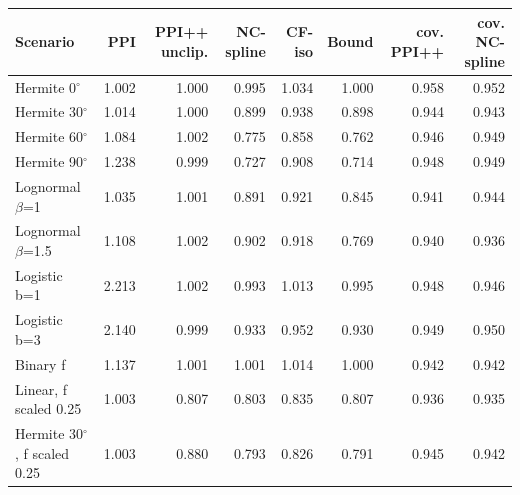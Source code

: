 \begin{tabular}{lrrrrrrr}
\toprule
Scenario & PPI & PPI++ unclip. & NC-spline & CF-iso & Bound & cov. PPI++ & cov. NC-spline \\
\midrule
Hermite 0$^\circ$ & 1.002 & 1.000 & 0.995 & 1.034 & 1.000 & 0.958 & 0.952 \\
Hermite 30$^\circ$ & 1.014 & 1.000 & 0.899 & 0.938 & 0.898 & 0.944 & 0.943 \\
Hermite 60$^\circ$ & 1.084 & 1.002 & 0.775 & 0.858 & 0.762 & 0.946 & 0.949 \\
Hermite 90$^\circ$ & 1.238 & 0.999 & 0.727 & 0.908 & 0.714 & 0.948 & 0.949 \\
Lognormal $\beta$=1 & 1.035 & 1.001 & 0.891 & 0.921 & 0.845 & 0.941 & 0.944 \\
Lognormal $\beta$=1.5 & 1.108 & 1.002 & 0.902 & 0.918 & 0.769 & 0.940 & 0.936 \\
Logistic b=1 & 2.213 & 1.002 & 0.993 & 1.013 & 0.995 & 0.948 & 0.946 \\
Logistic b=3 & 2.140 & 0.999 & 0.933 & 0.952 & 0.930 & 0.949 & 0.950 \\
Binary f & 1.137 & 1.001 & 1.001 & 1.014 & 1.000 & 0.942 & 0.942 \\
Linear, f scaled 0.25 & 1.003 & 0.807 & 0.803 & 0.835 & 0.807 & 0.936 & 0.935 \\
Hermite 30$^\circ$, f scaled 0.25 & 1.003 & 0.880 & 0.793 & 0.826 & 0.791 & 0.945 & 0.942 \\
\bottomrule
\end{tabular}